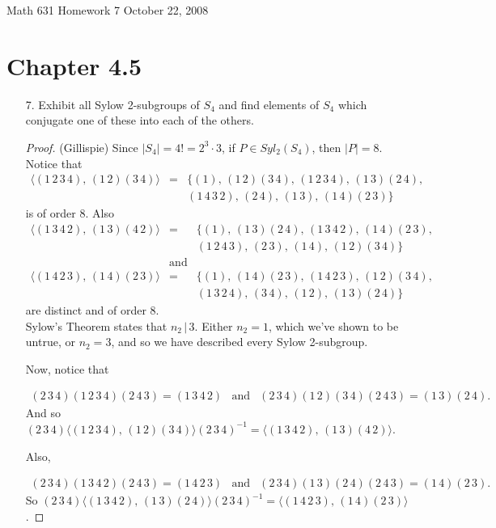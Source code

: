 \documentclass[10pt]{article}
\newcommand{\divides}{\, \Big | \,}
\newcommand\header{{\sc Math 631 \hfill Homework 7 \hfill October 22, 2008}}
\begin{document}
\header  

\section*{Chapter 4.5}

\begin{itemize}

\item[7.]  Exhibit all Sylow 2-subgroups of $S_{4}$
and find elements of $S_{4}$ which conjugate one of these into each
of the others.

\begin{proof}(Gillispie) 
Since $|S_{4}|=4!=2^{3}\cdot3$, if $P\in Syl_{2}(S_{4})$,
then $|P|=8$.\\
Notice that \begin{eqnarray*}
\langle(1\,2\,3\,4),\,(1\,2)(3\,4)\rangle & = & \{(1),\,(1\,2)(3\,4),\,(1\,2\,3\,4),\,(1\,3)(2\,4),\\
 &  & (1\,4\,3\,2),\,(2\,4),\,(1\,3),\,(1\,4)(2\,3)\}\end{eqnarray*}
is of order $8$. Also\begin{eqnarray*}
\langle(1\,3\,4\,2),\,(1\,3)(4\,2)\rangle & = & \{(1),\,(1\,3)(2\,4),\,(1\,3\,4\,2),\,(1\,4)(2\,3),\\
 &  & (1\,2\,4\,3),\,(2\,3),\,(1\,4),\,(1\,2)(3\,4)\}\\
 & \mbox{and}\\
\langle(1\,4\,2\,3),\,(1\,4)(2\,3)\rangle & = & \{(1),\,(1\,4)(2\,3),\,(1\,4\,2\,3),\,(1\,2)(3\,4),\\
 &  & (1\,3\,2\,4),\,(3\,4),\,(1\,2),\,(1\,3)(2\,4)\}\end{eqnarray*}
are distinct and of order 8.\\
Sylow's Theorem states that $n_{2}\divides3$. Either $n_{2}=1$,
which we've shown to be untrue, or $n_{2}=3$, and so we have described
every Sylow 2-subgroup.

Now, notice that

\begin{eqnarray*}
(2\,3\,4)(1\,2\,3\,4)(2\,4\,3)=(1\,3\,4\,2) & \mbox{and} & (2\,3\,4)(1\,2)(3\,4)(2\,4\,3)=(1\,3)(2\,4).\end{eqnarray*}
And so $(2\,3\,4)\langle(1\,2\,3\,4),\,(1\,2)(3\,4)\rangle(2\,3\,4)^{-1}=\langle(1\,3\,4\,2),\,(1\,3)(4\,2)\rangle$.

Also,

\begin{eqnarray*}
(2\,3\,4)(1\,3\,4\,2)(2\,4\,3)=(1\,4\,2\,3) & \mbox{and} & (2\,3\,4)(1\,3)(2\,4)(2\,4\,3)=(1\,4)(2\,3).\end{eqnarray*}
So $(2\,3\,4)\langle(1\,3\,4\,2),\,(1\,3)(2\,4)\rangle(2\,3\,4)^{-1}=\langle(1\,4\,2\,3),\,(1\,4)(2\,3)\rangle$.


\end{proof}
\end{itemize}
\end{document}

